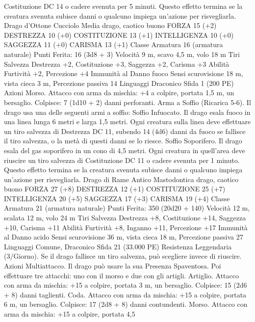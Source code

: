 \begin{multicols}{2}
Costituzione DC 14 o cadere svenuta per 5 minuti. Questo effetto
termina se la creatura svenuta subisce danni o qualcuno impiega
un’azione per risvegliarla.
Drago d’Ottone Cucciolo
Media drago, caotico buono
FORZA 15 (+2)
DESTREZZA 10 (+0)
COSTITUZIONE 13 (+1)
INTELLIGENZA 10 (+0)
SAGGEZZA 11 (+0)
CARISMA 13 (+1)
Classe Armatura 16 (armatura naturale)
\hspace*{0pt}\hfill{Punti Ferita}: 16 (3d8 + 3)
Velocità 9 m, scavo 4,5 m, volo 18 m
Tiri Salvezza Destrezza +2, Costituzione +3, Saggezza +2,
Carisma +3
Abilità Furtività +2, Percezione +4
Immunità al Danno fuoco
Sensi scurovisione 18 m, vista cieca 3 m, Percezione passiva 14
Linguaggi Draconico
Sfida 1 (200 PE)
Azioni
Morso. Attacco con arma da mischia: +4 a colpire, portata 1,5
m, un bersaglio.
Colpisce: 7 (1d10 + 2) danni perforanti.
Arma a Soffio (Ricarica 5-6). Il drago usa una delle seguenti armi
a soffio:
Soffio Infuocato. Il drago esala fuoco in una linea lunga 6 metri e
larga 1,5 metri. Ogni creatura sulla linea deve effettuare un tiro
salvezza di Destrezza DC 11, subendo 14 (4d6) danni da fuoco se
fallisce il tiro salvezza, o la metà di questi danni se lo riesce.
Soffio Soporifero. Il drago esala del gas soporifero in un cono di 4,5
metri. Ogni creatura in quell’area deve riuscire un tiro salvezza di
Costituzione DC 11 o cadere svenuta per 1 minuto. Questo effetto
termina se la creatura svenuta subisce danni o qualcuno impiega
un’azione per risvegliarla.
Drago di Rame Antico
Mastodontica drago, caotico buono
FORZA 27 (+8)
DESTREZZA 12 (+1)
COSTITUZIONE 25 (+7)
INTELLIGENZA 20 (+5)
SAGGEZZA 17 (+3)
CARISMA 19 (+4)
Classe Armatura 21 (armatura naturale)
\hspace*{0pt}\hfill{Punti Ferita}: 350 (20d20 + 140)
Velocità 12 m, scalata 12 m, volo 24 m
Tiri Salvezza Destrezza +8, Costituzione +14, Saggezza +10,
Carisma +11
Abilità Furtività +8, Inganno +11, Percezione +17
Immunità al Danno acido
Sensi scurovisione 36 m, vista cieca 18 m, Percezione passiva 27
Linguaggi Comune, Draconico
Sfida 21 (33.000 PE)
Resistenza Leggendaria (3/Giorno). Se il drago fallisce un tiro
salvezza, può scegliere invece di riuscire.
Azioni
Multiattacco. Il drago può usare la sua Presenza Spaventosa. Poi
effettuare tre attacchi: uno con il morso e due con gli artigli.
Artiglio. Attacco con arma da mischia: +15 a colpire, portata 3
m, un bersaglio.
Colpisce: 15 (2d6 + 8) danni taglienti.
Coda. Attacco con arma da mischia: +15 a colpire, portata 6 m,
un bersaglio.
Colpisce: 17 (2d8 + 8) danni contundenti.
Morso. Attacco con arma da mischia: +15 a colpire, portata 4,5

\end{multicols}
